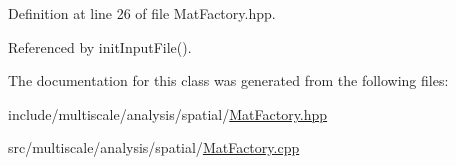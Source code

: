 Definition at line 26 of file Mat\-Factory.\-hpp.



Referenced by init\-Input\-File().



The documentation for this class was generated from the following files\-:\begin{DoxyCompactItemize}
\item 
include/multiscale/analysis/spatial/\hyperlink{MatFactory_8hpp}{Mat\-Factory.\-hpp}\item 
src/multiscale/analysis/spatial/\hyperlink{MatFactory_8cpp}{Mat\-Factory.\-cpp}\end{DoxyCompactItemize}

